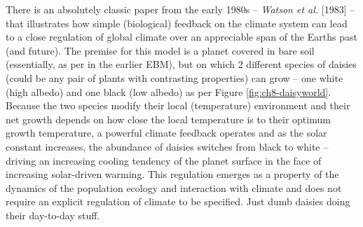 \documentclass{tufte-book} %
\begin{document}
There is an absolutely classic paper from the early 1980s -- \textit{Watson et al.} [1983] -- that illustrates how simple (biological) feedback on the climate system can lead to a close regulation of global climate over an appreciable span of the Earths past (and future). The premise for this model is a planet covered in bare soil (essentially, as per in the earlier EBM), but on which 2 different species of daisies (could be any pair of plants with contrasting properties) can grow -- one white (high albedo) and one black (low albedo) as per Figure \ref{fig:ch8-daisyworld}. Because the two species modify their local (temperature) environment and their net growth depends on how close the local temperature is to their optimum growth temperature, a powerful climate feedback operates and as the solar constant increases, the abundance of daisies switches from black to white -- driving an increasing cooling tendency of the planet surface in the face of increasing solar-driven warming. This regulation emerges as a property of the dynamics of the population ecology and interaction with climate and does not require an explicit regulation of climate to be specified. Just dumb daisies doing their day-to-day stuff.
\end{document}
